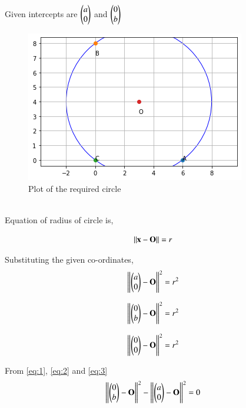 \documentclass[journal,12pt,twocolumn]{IEEEtran}
\begin{document}
Given intercepts are $\begin{pmatrix}a\\0\end{pmatrix}$ and $\begin{pmatrix}0\\b\end{pmatrix}$ \\
\begin{figure}[!h]
         \centering
         \includegraphics[width=\columnwidth]{figure3.png}
         \caption{Plot of the required circle}
         \label{Figure}
\end{figure}\\
Equation of radius of circle is,

\begin{equation}
   \lVert\mathbf{x}-\mathbf{O}\rVert=r
\end{equation}

Substituting the given co-ordinates,
\begin{equation}
\left\lVert {\ensuremath{\begin{pmatrix}a\\0\end{pmatrix}}-\mathbf{O}}\right\rVert^2=r^2 \label{eq:1}
\end{equation}


 \begin{equation}
\left\lVert {\ensuremath{\begin{pmatrix}0\\b\end{pmatrix}}-\mathbf{O}}\right\rVert^2=r^2 \label{eq:2}
\end{equation}



\begin{equation}
\left\lVert {\ensuremath{\begin{pmatrix}0\\0\end{pmatrix}}-\mathbf{O}}\right\rVert^2=r^2 \label{eq:3}
\end{equation}


From \ref{eq:1}, \ref{eq:2} and \ref{eq:3}
\\
\begin{equation}
    \left\lVert {\ensuremath{\begin{pmatrix}0\\b\end{pmatrix}}-\mathbf{O}}\right\rVert^2 - \left\lVert {\ensuremath{\begin{pmatrix}a\\0\end{pmatrix}}-\mathbf{O}}\right\rVert^2= 0 \label{eq:4}
\end{equation}
\end{document}
